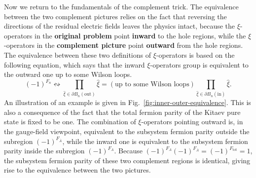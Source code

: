 \documentclass[12font]{article}
\theoremstyle{definition}
\newcommand{\lr}[1]{\left(  #1  \right)}
\newcommand{\de}{\partial}
\newcommand{\mrm}[1]{\mathrm{#1}}
\newcommand{\alert}[1]{{\color{red}#1}}
\begin{document}
Now we return to the fundamentals of the complement trick. The equivalence between the two complement pictures relies on the fact that reversing the directions of the residual electric fields leaves the physics intact, because the $\xi$-operators in the \textbf{original problem} point \textbf{inward} to the hole regions, while the $\xi$-operators in the \textbf{complement picture} point \textbf{outward} from the hole regions. The equivalence between these two definitions of $\xi$-operators is based on the following equation, which says that the inward $\xi$-operators group is equivalent to the outward one up to some Wilson loops.  
\begin{equation}\label{eq:inner-outer-equivalent}
    (-1)^{F_n} 
    \leftrightsquigarrow 
    \prod_{\hat{\xi}\in\de B_n(\mrm{out})}\hat{\xi}
    = 
    \lr{\text{up to some Wilson loops}}
    \prod_{\hat{\xi} \in \de B_n(\mrm{in})}\hat{\xi}. 
\end{equation}
An illustration of an example is given in Fig.~\eqref{fig:inner-outer-equivalence}. This is also a consequence of the fact that the total fermion parity of the Kitaev pure state is fixed to be one. The combination of $\xi$-operators pointing outward is, in the gauge-field viewpoint, equivalent to the subsystem fermion parity outside the subregion $(-1)^{F_{\overline{A}}}$, while the inward one is equivalent to the subsystem fermion parity inside the subregion $(-1)^{F_A}$. Because $(-1)^{F_A}(-1)^{F_{\overline{A}}} = (-1)^{F_{\mrm{tot}}} = 1$, the subsystem fermion parity of these two complement regions is identical, giving rise to the equivalence between the two pictures.
%
\end{document}
